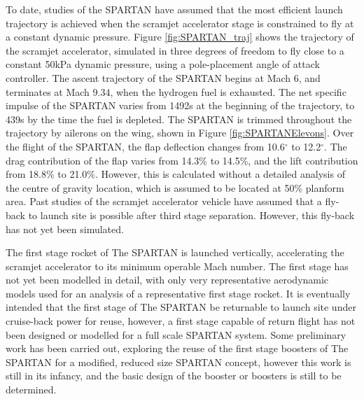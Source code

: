    To date, studies of the SPARTAN have assumed that the most efficient launch trajectory is achieved when the scramjet accelerator stage is constrained to fly at a constant dynamic pressure\cite{Preller2017b,Preller2018a}.
  Figure \ref{fig:SPARTAN_traj} shows the trajectory of the scramjet accelerator, simulated in three degrees of freedom to fly close to a constant 50kPa dynamic pressure, using a pole-placement angle of attack controller\cite{Preller2017b}.
  The ascent trajectory of the SPARTAN begins at Mach 6, and terminates at Mach 9.34, when the hydrogen fuel is exhausted\cite{Preller2018a}. 
  The net specific impulse of the SPARTAN varies from 1492s at the beginning of the trajectory, to 439s by the time the fuel is depleted\cite{Preller2017b}. 
  The SPARTAN is trimmed throughout the trajectory by ailerons on the wing, shown in Figure \ref{fig:SPARTANElevons}. Over the flight of the SPARTAN, the flap deflection changes from 10.6$^\circ$ to 12.2$^\circ$\cite{Preller2018a}. The drag contribution of the flap varies from 14.3\% to 14.5\%, and the lift contribution from 18.8\% to 21.0\%\cite{Preller2018a}. However, this is calculated without a detailed analysis of the centre of gravity location, which is assumed to be located at 50\% planform area. 
  Past studies of the scramjet accelerator vehicle have assumed that a fly-back to launch site is possible after third stage separation\cite{Preller2017b,Preller2018a}. However, this fly-back has not yet been simulated. 
  
 

The first stage rocket of The SPARTAN is launched vertically, accelerating the scramjet accelerator to its minimum operable Mach number. The first stage has not yet been modelled in detail, with only very representative aerodynamic models used for an analysis of a representative first stage rocket.
It is eventually intended that the first stage of The SPARTAN be returnable to launch site under cruise-back power for reuse, however, a first stage capable of return flight has not been designed or modelled for a full scale SPARTAN system\cite{Preller2017b,Preller2018a}.
 Some preliminary work has been carried out, exploring the reuse of the first stage boosters of The SPARTAN \cite{chai2017} for a modified, reduced size SPARTAN concept, however this work is still in its infancy, and the basic design of the booster or boosters is still to be determined\cite{Preller2017b,Preller2018a}.
 
  

